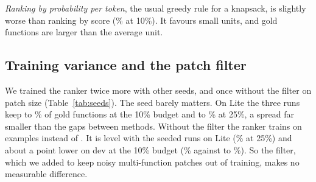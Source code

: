 \emph{Ranking by probability per token}, the usual greedy rule for a knapsack, is slightly worse than ranking by score (\% at 10\%). It favours small units, and gold functions are larger than the average unit.

\subsection{Training variance and the patch filter}
\label{sec:seeds}

\begin{table}[t]
\caption{Training variance: gold-function recall (\%) of the trained ranker on dev, where the checkpoint is chosen, and on Lite, gold files + direct imports. The runs differ only in the seed, and in the last row in the filter that drops training patches touching more than five functions.}
\label{tab:seeds}
\centering
\scriptsize
\setlength{\tabcolsep}{2.5pt}
\end{table}

We trained the ranker twice more with other seeds, and once without the filter on patch size (Table~\ref{tab:seeds}). The seed barely matters. On Lite the three runs keep  to \% of gold functions at the 10\% budget and  to \% at 25\%, a spread far smaller than the gaps between methods. Without the filter the ranker trains on  examples instead of . It is level with the seeded runs on Lite (\% at 25\%) and about a point lower on dev at the 10\% budget (\% against  to \%). So the filter, which we added to keep noisy multi-function patches out of training, makes no measurable difference.
